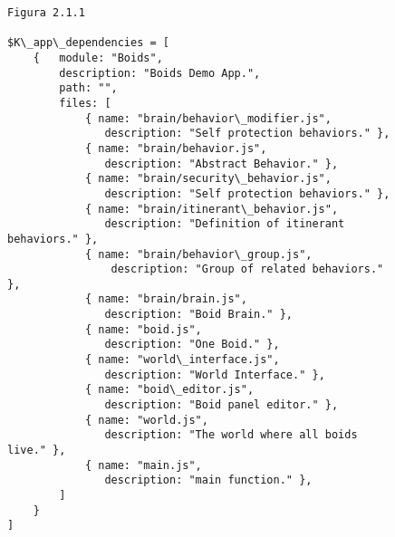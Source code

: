 \begin{figure}[p]
\begin{verbatim}
Figura 2.1.1

$K\_app\_dependencies = [
    {   module: "Boids", 
        description: "Boids Demo App.",
        path: "",
        files: [
            { name: "brain/behavior\_modifier.js",  
               description: "Self protection behaviors." },
            { name: "brain/behavior.js",           
               description: "Abstract Behavior." },
            { name: "brain/security\_behavior.js",  
               description: "Self protection behaviors." },
            { name: "brain/itinerant\_behavior.js", 
               description: "Definition of itinerant behaviors." },
            { name: "brain/behavior\_group.js",     
                description: "Group of related behaviors." },
            { name: "brain/brain.js",              
               description: "Boid Brain." },
            { name: "boid.js",                     
               description: "One Boid." },
            { name: "world\_interface.js",          
               description: "World Interface." },
            { name: "boid\_editor.js",              
               description: "Boid panel editor." },
            { name: "world.js",                    
               description: "The world where all boids live." },
            { name: "main.js",                     
               description: "main function." },
        ]
    }
]
\end{verbatim}
\end{figure}